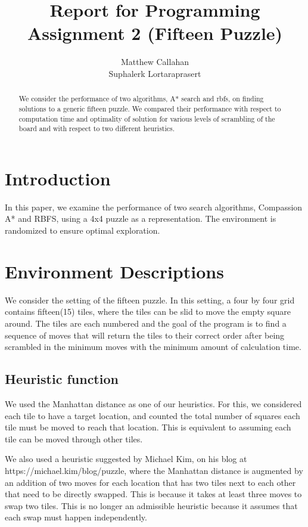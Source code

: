 \documentclass{article}
\title{Report for Programming Assignment 2 (Fifteen Puzzle)}
\author{%
  Matthew Callahan\\
  \And
  Suphalerk Lortaraprasert
}
\begin{document}
\maketitle


\begin{abstract}
 We consider the performance of two algorithms, A* search and rbfs, on finding solutions to a generic fifteen puzzle. We compared their performance with respect to computation time and optimality of solution for various levels of scrambling of the board and with respect to two different heuristics. 
\end{abstract}

\section{Introduction}

In this paper, we examine the performance of two search algorithms, Compassion A* and RBFS, using a 4x4 puzzle as a representation. The environment is randomized to ensure optimal exploration. 

\section{Environment Descriptions}
We consider the setting of the fifteen puzzle. In this setting, a four by four grid contains fifteen(15) tiles, where the tiles can be slid to move the empty square around. The tiles are each numbered and the goal of the program is to find a sequence of moves that will return the tiles to their correct order after being scrambled in the minimum moves with the minimum amount of calculation time. 

\subsection{Heuristic function}
We used the Manhattan distance as one of our heuristics. For this, we considered each tile to have a target location, and counted the total number of squares each tile must be moved to reach that location. This is equivalent to assuming each tile can be moved through other tiles.

We also used a heuristic suggested by Michael Kim, on his blog at https://michael.kim/blog/puzzle, where the Manhattan distance is augmented by an addition of two moves for each location that has two tiles next to each other that need to be directly swapped. This is because it takes at least three moves to swap two tiles. This is no longer an admissible heuristic because it assumes that each swap must happen independently. 
\end{document}
